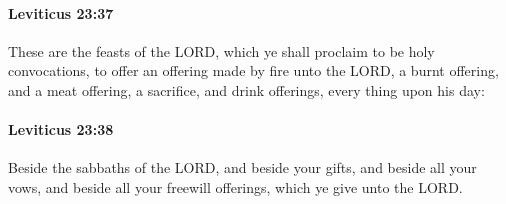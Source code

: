		\paragraph{Leviticus 23:37} %
			\label{LEVITICUS-23-37}

			These are the feasts of the LORD, which ye shall proclaim to be holy convocations, to offer an offering made by fire unto the LORD, a burnt offering, and a meat offering, a sacrifice, and drink offerings, every thing upon his day:


		\paragraph{Leviticus 23:38} %
			\label{LEVITICUS-23-38}

			Beside the sabbaths of the LORD, and beside your gifts, and beside all your vows, and beside all your freewill offerings, which ye give unto the LORD.

